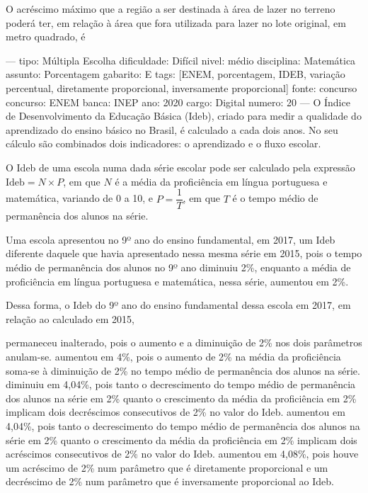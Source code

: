 O acréscimo máximo que a região a ser destinada à área de lazer no terreno poderá ter, em relação à área que fora utilizada para lazer no lote original, em metro quadrado, é
\begin{choices}
\end{choices}

---
tipo: Múltipla Escolha
dificuldade: Difícil
nivel: médio
disciplina: Matemática
assunto: Porcentagem
gabarito: E
tags: [ENEM, porcentagem, IDEB, variação percentual, diretamente proporcional, inversamente proporcional]
fonte: concurso
concurso: ENEM
banca: INEP
ano: 2020
cargo: Digital
numero: 20
---
\question
O Índice de Desenvolvimento da Educação Básica (Ideb), criado para medir a qualidade do aprendizado do ensino básico no Brasil, é calculado a cada dois anos. No seu cálculo são combinados dois indicadores: o aprendizado e o fluxo escolar.

O Ideb de uma escola numa dada série escolar pode ser calculado pela expressão $\text{Ideb} = N \times P$, em que $N$ é a média da proficiência em língua portuguesa e matemática, variando de 0 a 10, e $P = \dfrac{1}{T}$, em que $T$ é o tempo médio de permanência dos alunos na série.

Uma escola apresentou no 9º ano do ensino fundamental, em 2017, um Ideb diferente daquele que havia apresentado nessa mesma série em 2015, pois o tempo médio de permanência dos alunos no 9º ano diminuiu 2\%, enquanto a média de proficiência em língua portuguesa e matemática, nessa série, aumentou em 2\%.

Dessa forma, o Ideb do 9º ano do ensino fundamental dessa escola em 2017, em relação ao calculado em 2015,
\begin{choices}
\choice permaneceu inalterado, pois o aumento e a diminuição de 2\% nos dois parâmetros anulam-se.
\choice aumentou em 4\%, pois o aumento de 2\% na média da proficiência soma-se à diminuição de 2\% no tempo médio de permanência dos alunos na série.
\choice diminuiu em 4,04\%, pois tanto o decrescimento do tempo médio de permanência dos alunos na série em 2\% quanto o crescimento da média da proficiência em 2\% implicam dois decréscimos consecutivos de 2\% no valor do Ideb.
\choice aumentou em 4,04\%, pois tanto o decrescimento do tempo médio de permanência dos alunos na série em 2\% quanto o crescimento da média da proficiência em 2\% implicam dois acréscimos consecutivos de 2\% no valor do Ideb.
\CorrectChoice aumentou em 4,08\%, pois houve um acréscimo de 2\% num parâmetro que é diretamente proporcional e um decréscimo de 2\% num parâmetro que é inversamente proporcional ao Ideb.
\end{choices}

